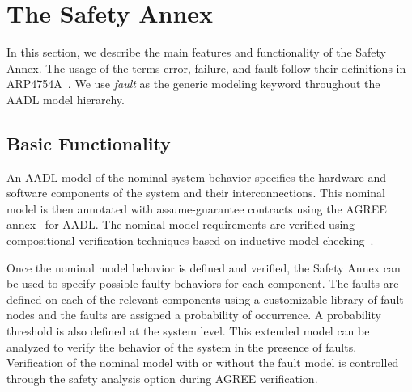 \section{The Safety Annex}
\label{sec:detailed_approach}

In this section, we describe the main features and functionality of the Safety Annex. The usage of the terms error, failure, and fault follow their definitions in ARP4754A~\cite{SAE:ARP4754A}. We use {\em fault} as the generic modeling keyword throughout the AADL model hierarchy.

\subsection{Basic Functionality}

An AADL model of the nominal system behavior specifies the hardware and software components of the system and their interconnections. This nominal model is then annotated with assume-guarantee contracts using the AGREE annex~\cite{NFM2012:CoGaMiWhLaLu} for AADL. The nominal model requirements are verified using compositional verification techniques based on inductive model checking~\cite{2017arXiv171201222G}.

Once the nominal model behavior is defined and verified, the Safety Annex can be used to specify possible faulty behaviors for each component. The faults are defined on each of the relevant components using a customizable library of fault nodes and the faults are assigned a probability of occurrence. A probability threshold is also defined at the system level. This extended model can be analyzed to verify the behavior of the system in the presence of faults. Verification of the nominal model with or without the fault model is controlled through the safety analysis option during AGREE verification.


